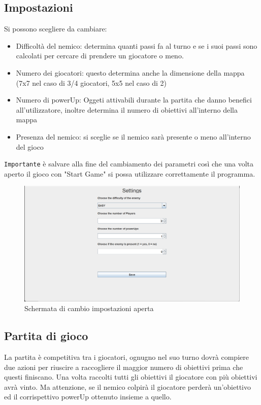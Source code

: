 \documentclass[a4paper,12pt]{report}
\begin{document}
\subsection*{Impostazioni}
Si possono scegliere da cambiare:
\begin{itemize} 
	\item Difficoltà del nemico: determina quanti passi fa al turno e se i suoi passi sono calcolati per cercare di prendere un giocatore o meno.
	\item Numero dei giocatori: questo determina anche la dimensione della mappa (7x7 nel caso di 3/4 giocatori, 5x5 nel caso di 2)
	\item Numero di powerUp: Oggeti attivabili durante la partita che danno benefici all'utilizzatore, inoltre determina il numero di obiettivi all'interno della mappa
	\item Presenza del nemico: si sceglie se il nemico sarà presente o meno all'interno del gioco
\end{itemize}
\texttt{Importante} è salvare alla fine del cambiamento dei parametri così che una volta aperto il gioco con "Start Game" si possa 
utilizzare correttamente il programma.
\begin{figure}[H]
	\centering
	\includegraphics[width=\textwidth]{img/SettingsMenu.png}
	\caption{Schermata di cambio impostazioni aperta}
	\label{img:Settings}
\end{figure}
\subsection*{Partita di gioco}

La partita è competitiva tra i giocatori, ognugno nel suo turno dovrà compiere due azioni per riuscire a raccogliere 
il maggior numero di obiettivi prima che questi finiscano. Una volta raccolti tutti gli obiettivi il giocatore con più obiettivi avrà vinto. 
Ma attenzione, se il nemico colpirà il giocatore perderà un'obiettivo ed il corrispettivo powerUp ottenuto insieme a quello.
\end{document}

